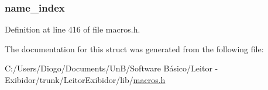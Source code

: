 \subsubsection[{name\+\_\+index}]{ name\+\_\+index}\label{structmethod__info_ae939ac3ca00f5727beaa02d0e339183d}


Definition at line 416 of file macros.\+h.



The documentation for this struct was generated from the following file\+:\begin{DoxyCompactItemize}
\item 
C\+:/\+Users/\+Diogo/\+Documents/\+Un\+B/\+Software Básico/\+Leitor -\/ Exibidor/trunk/\+Leitor\+Exibidor/lib/\hyperlink{macros_8h}{macros.\+h}\end{DoxyCompactItemize}
